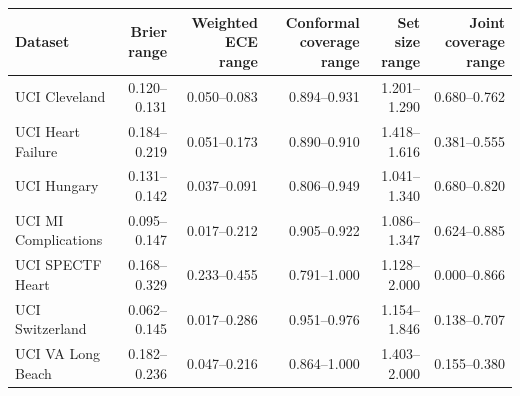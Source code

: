 \begin{tabular}{lrrrrr}
\toprule
Dataset & Brier range & Weighted ECE range & Conformal coverage range & Set size range & Joint coverage range \\
\midrule
UCI Cleveland & 0.120--0.131 & 0.050--0.083 & 0.894--0.931 & 1.201--1.290 & 0.680--0.762 \\
UCI Heart Failure & 0.184--0.219 & 0.051--0.173 & 0.890--0.910 & 1.418--1.616 & 0.381--0.555 \\
UCI Hungary & 0.131--0.142 & 0.037--0.091 & 0.806--0.949 & 1.041--1.340 & 0.680--0.820 \\
UCI MI Complications & 0.095--0.147 & 0.017--0.212 & 0.905--0.922 & 1.086--1.347 & 0.624--0.885 \\
UCI SPECTF Heart & 0.168--0.329 & 0.233--0.455 & 0.791--1.000 & 1.128--2.000 & 0.000--0.866 \\
UCI Switzerland & 0.062--0.145 & 0.017--0.286 & 0.951--0.976 & 1.154--1.846 & 0.138--0.707 \\
UCI VA Long Beach & 0.182--0.236 & 0.047--0.216 & 0.864--1.000 & 1.403--2.000 & 0.155--0.380 \\
\bottomrule
\end{tabular}
